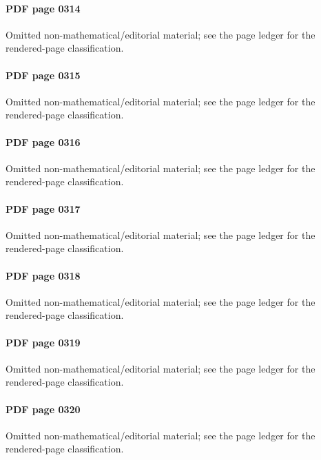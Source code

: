 \paragraph{PDF page 0314}\uses{}\label{mcrt-omitted-p0314} Omitted non-mathematical/editorial material; see the page ledger for the rendered-page classification.\par
\paragraph{PDF page 0315}\uses{}\label{mcrt-omitted-p0315} Omitted non-mathematical/editorial material; see the page ledger for the rendered-page classification.\par
\paragraph{PDF page 0316}\uses{}\label{mcrt-omitted-p0316} Omitted non-mathematical/editorial material; see the page ledger for the rendered-page classification.\par
\paragraph{PDF page 0317}\uses{}\label{mcrt-omitted-p0317} Omitted non-mathematical/editorial material; see the page ledger for the rendered-page classification.\par
\paragraph{PDF page 0318}\uses{}\label{mcrt-omitted-p0318} Omitted non-mathematical/editorial material; see the page ledger for the rendered-page classification.\par
\paragraph{PDF page 0319}\uses{}\label{mcrt-omitted-p0319} Omitted non-mathematical/editorial material; see the page ledger for the rendered-page classification.\par
\paragraph{PDF page 0320}\uses{}\label{mcrt-omitted-p0320} Omitted non-mathematical/editorial material; see the page ledger for the rendered-page classification.\par
